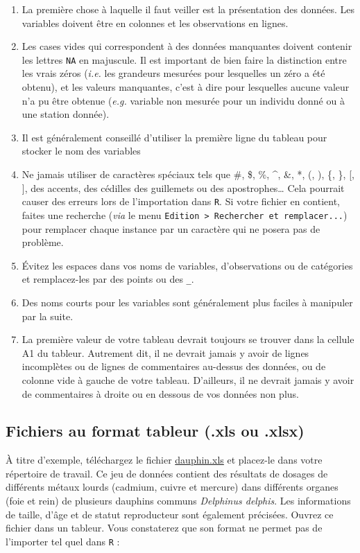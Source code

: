 \documentclass[
  a4paper,
  DIV=11,
  numbers=noendperiod,
  oneside]{scrreprt}
\providecommand{\tightlist}{%
  \setlength{\itemsep}{0pt}\setlength{\parskip}{0pt}}\usepackage{longtable,booktabs,array}
\begin{document}
\begin{enumerate}
\def\labelenumi{\arabic{enumi}.}
\tightlist
\item
  La première chose à laquelle il faut veiller est la présentation des
  données. Les variables doivent être en colonnes et les observations en
  lignes.
\item
  Les cases vides qui correspondent à des données manquantes doivent
  contenir les lettres \texttt{NA} en majuscule. Il est important de
  bien faire la distinction entre les vrais zéros (\emph{i.e.} les
  grandeurs mesurées pour lesquelles un zéro a été obtenu), et les
  valeurs manquantes, c'est à dire pour lesquelles aucune valeur n'a pu
  être obtenue (\emph{e.g.} variable non mesurée pour un individu donné
  ou à une station donnée).
\item
  Il est généralement conseillé d'utiliser la première ligne du tableau
  pour stocker le nom des variables
\item
  Ne jamais utiliser de caractères spéciaux tels que \#, \$, \%, \^{},
  \&, *, (, ), \{, \}, {[}, {]}, des accents, des cédilles des
  guillemets ou des apostrophes\ldots{} Cela pourrait causer des erreurs
  lors de l'importation dans \texttt{R}. Si votre fichier en contient,
  faites une recherche (\emph{via} le menu
  \texttt{Edition\ \textgreater{}\ Rechercher\ et\ remplacer...}) pour
  remplacer chaque instance par un caractère qui ne posera pas de
  problème.
\item
  Évitez les espaces dans vos noms de variables, d'observations ou de
  catégories et remplacez-les par des points ou des \texttt{\_}.
\item
  Des noms courts pour les variables sont généralement plus faciles à
  manipuler par la suite.
\item
  La première valeur de votre tableau devrait toujours se trouver dans
  la cellule A1 du tableur. Autrement dit, il ne devrait jamais y avoir
  de lignes incomplètes ou de lignes de commentaires au-dessus des
  données, ou de colonne vide à gauche de votre tableau. D'ailleurs, il
  ne devrait jamais y avoir de commentaires à droite ou en dessous de
  vos données non plus.
\end{enumerate}

\subsection{Fichiers au format tableur (.xls ou .xlsx)}\label{tableur}

À titre d'exemple, téléchargez le fichier
\href{data/dauphin.xls}{dauphin.xls} et placez-le dans votre répertoire
de travail. Ce jeu de données contient des résultats de dosages de
différents métaux lourds (cadmium, cuivre et mercure) dans différents
organes (foie et rein) de plusieurs dauphins communs \emph{Delphinus
delphis}. Les informations de taille, d'âge et de statut reproducteur
sont également précisées. Ouvrez ce fichier dans un tableur. Vous
constaterez que son format ne permet pas de l'importer tel quel dans
\texttt{R} :
\end{document}
